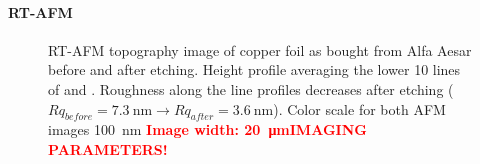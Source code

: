 	\paragraph{RT-AFM}
	\label{sec:foil-AFM}
	\begin{figure}[] \centering
		 \quad
		\caption{RT-AFM topography image of copper foil as bought from Alfa Aesar  before and  after etching.  Height profile averaging the lower 10 lines of  and . Roughness along the line profiles decreases after etching ($Rq_{before}=\SI{7.3}{\nano \meter} \rightarrow Rq_{after}=\SI{3.6}{\nano \meter}$). Color scale for both AFM images \SI{100}{\nano \meter} \textcolor{red}{\textbf{Image width: \SI{20}{\micro \meter}IMAGING PARAMETERS!}}}
		\label{fig:foil-afm-as-bought}
	\end{figure}
	
